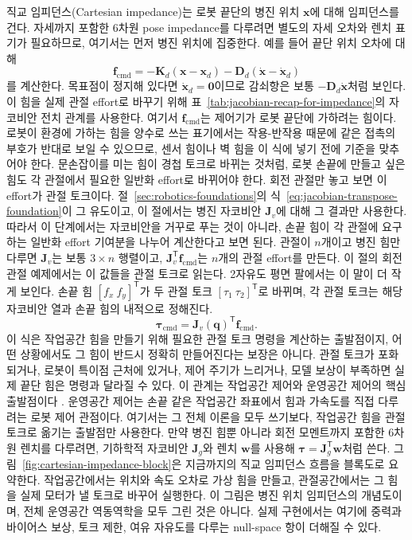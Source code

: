 직교 임피던스(Cartesian impedance)는 로봇 끝단의 병진 위치 $\bm{x}$에 대해 임피던스를 건다.
자세까지 포함한 6차원 pose impedance를 다루려면 별도의 자세 오차와 렌치 표기가 필요하므로, 여기서는 먼저 병진 위치에 집중한다.
예를 들어 끝단 위치 오차에 대해
\begin{equation}
  \bm{f}_{\mathrm{cmd}}
  =
  -\bm{K}_d(\bm{x}-\bm{x}_d)
  -
  \bm{D}_d(\dot{\bm{x}}-\dot{\bm{x}}_d)
\end{equation}
를 계산한다.
목표점이 정지해 있다면 $\dot{\bm{x}}_d=\bm{0}$이므로 감쇠항은 보통 $-\bm{D}_d\dot{\bm{x}}$처럼 보인다.
이 힘을 실제 관절 effort로 바꾸기 위해 표~\ref{tab:jacobian-recap-for-impedance}의 자코비안 전치 관계를 사용한다.
%
여기서 $\bm{f}_{\mathrm{cmd}}$는 제어기가 로봇 끝단에 가하려는 힘이다.
로봇이 환경에 가하는 힘을 양수로 쓰는 표기에서는 작용-반작용 때문에 같은 접촉의 부호가 반대로 보일 수 있으므로, 센서 힘이나 벽 힘을 이 식에 넣기 전에 기준을 맞추어야 한다.
문손잡이를 미는 힘이 경첩 토크로 바뀌는 것처럼, 로봇 손끝에 만들고 싶은 힘도 각 관절에서 필요한 일반화 effort로 바뀌어야 한다.
%
회전 관절만 놓고 보면 이 effort가 관절 토크이다.
절~\ref{sec:robotics-foundations}의 식~\eqref{eq:jacobian-transpose-foundation}이 그 유도이고, 이 절에서는 병진 자코비안 $\bm{J}_v$에 대해 그 결과만 사용한다.
따라서 이 단계에서는 자코비안을 거꾸로 푸는 것이 아니라, 손끝 힘이 각 관절에 요구하는 일반화 effort 기여분을 나누어 계산한다고 보면 된다.
관절이 $n$개이고 병진 힘만 다루면 $\bm{J}_v$는 보통 $3\times n$ 행렬이고, $\bm{J}_v^{\mathsf{T}}\bm{f}_{\mathrm{cmd}}$는 $n$개의 관절 effort를 만든다.
%
이 절의 회전 관절 예제에서는 이 값들을 관절 토크로 읽는다.
2자유도 평면 팔에서는 이 말이 더 작게 보인다.
손끝 힘 \([f_x\ f_y]^{\mathsf{T}}\)가 두 관절 토크 \([\tau_1\ \tau_2]^{\mathsf{T}}\)로 바뀌며, 각 관절 토크는 해당 자코비안 열과 손끝 힘의 내적으로 정해진다.
\begin{equation}
  \bm{\tau}_{\mathrm{cmd}}
  =
  \bm{J}_v(\bm{q})^{\mathsf{T}}
  \bm{f}_{\mathrm{cmd}}.
  \label{eq:cartesian_to_joint_torque}
\end{equation}
이 식은 작업공간 힘을 만들기 위해 필요한 관절 토크 명령을 계산하는 출발점이지, 어떤 상황에서도 그 힘이 반드시 정확히 만들어진다는 보장은 아니다.
관절 토크가 포화되거나, 로봇이 특이점 근처에 있거나, 제어 주기가 느리거나, 모델 보상이 부족하면 실제 끝단 힘은 명령과 달라질 수 있다.
이 관계는 작업공간 제어와 운영공간 제어의 핵심 출발점이다 \cite{khatib1987operationalspace}.
운영공간 제어는 손끝 같은 작업공간 좌표에서 힘과 가속도를 직접 다루려는 로봇 제어 관점이다.
여기서는 그 전체 이론을 모두 쓰기보다, 작업공간 힘을 관절 토크로 옮기는 출발점만 사용한다.
만약 병진 힘뿐 아니라 회전 모멘트까지 포함한 6차원 렌치를 다루려면, 기하학적 자코비안 $\bm{J}_g$와 렌치 $\bm{w}$를 사용해 $\bm{\tau}=\bm{J}_g^{\mathsf{T}}\bm{w}$처럼 쓴다.
그림~\ref{fig:cartesian-impedance-block}은 지금까지의 직교 임피던스 흐름을 블록도로 요약한다.
작업공간에서는 위치와 속도 오차로 가상 힘을 만들고, 관절공간에서는 그 힘을 실제 모터가 낼 토크로 바꾸어 실행한다.
이 그림은 병진 위치 임피던스의 개념도이며, 전체 운영공간 역동역학을 모두 그린 것은 아니다.
실제 구현에서는 여기에 중력과 바이어스 보상, 토크 제한, 여유 자유도를 다루는 null-space 항이 더해질 수 있다.

